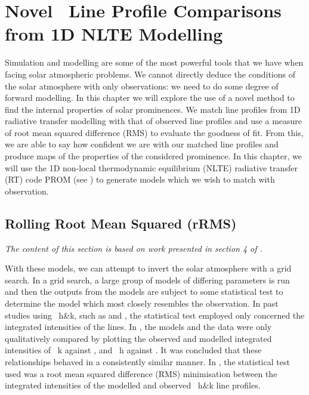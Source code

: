 \chapter{Novel \mgii\ Line Profile Comparisons from 1D NLTE Modelling}\label{Chap:prom}


Simulation and modelling are some of the most powerful tools that we have when facing solar atmospheric problems. We cannot directly deduce the conditions of the solar atmosphere with only observations: we need to do some degree of forward modelling. In this chapter we will explore the use of a novel method to find the internal properties of solar prominences. We match line profiles from 1D radiative transfer modelling with that of observed line profiles and use a measure of root mean squared difference (RMS) to evaluate the goodness of fit. From this, we are able to say how confident we are with our matched line profiles and produce maps of the properties of the considered prominence. In this chapter, we will use the 1D non-local thermodynamic equilibrium (NLTE) radiative transfer (RT) code PROM (see ) to generate models which we wish to match with observation.

\section{Rolling Root Mean Squared (rRMS)}
\textit{The content of this section is based on work presented in section 4 of \cite{peat_solar_2021}.}
\label{rrms}

With these models, we can attempt to invert the solar atmosphere with a grid search. In a grid search, a large group of models of differing parameters is run and then the outputs from the models are subject to some statistical test to determine the model which most closely resembles the observation. In past studies using ~h\&k, such as \cite{ruan_diagnostics_2019} and \cite{zhang_launch_2019}, the statistical test employed only concerned the integrated intensities of the lines. In \cite{ruan_diagnostics_2019}, the models and the data were only qualitatively compared by plotting the observed and modelled integrated intensities of \mgii~k against \ha, and  \mgii~h against \ha. It was concluded that these relationships behaved in a consistently similar manner. In \cite{zhang_launch_2019}, the statistical test used was a root mean squared difference (RMS) minimisation between the integrated intensities of the modelled and observed \mgii~h\&k line profiles.

